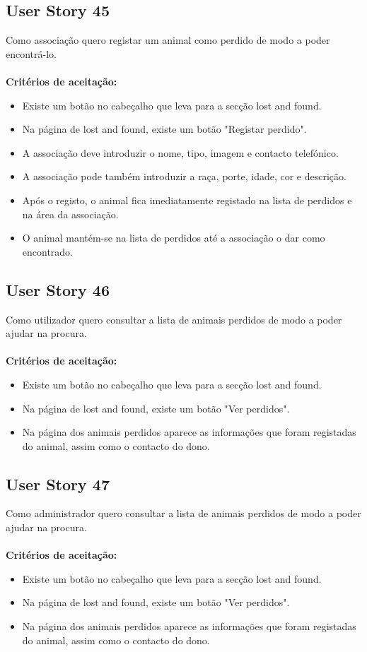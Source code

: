 \documentclass[a4paper,11pt]{article}
\begin{document}
\subsection*{User Story 45}
Como associação quero registar um animal como perdido de modo a poder encontrá-lo.\\\\
\textbf{Critérios de aceitação:}
\begin{itemize}
  \item Existe um botão no cabeçalho que leva para a secção lost and found.
  \item Na página de lost and found, existe um botão "Registar perdido".
  \item A associação deve introduzir o nome, tipo, imagem e contacto telefónico.
  \item A associação pode também introduzir a raça, porte, idade, cor e descrição.
  \item Após o registo, o animal fica imediatamente registado na lista de perdidos e na área da associação.
  \item O animal mantém-se na lista de perdidos até a associação o dar como encontrado.
\end{itemize}

\subsection*{User Story 46}
Como utilizador quero consultar a lista de animais perdidos de modo a poder ajudar na procura.\\\\
\textbf{Critérios de aceitação:}
\begin{itemize}
  \item Existe um botão no cabeçalho que leva para a secção lost and found.
  \item Na página de lost and found, existe um botão "Ver perdidos".
  \item Na página dos animais perdidos aparece as informações que foram registadas do animal, assim como o contacto do dono.
\end{itemize}

\subsection*{User Story 47}
Como administrador quero consultar a lista de animais perdidos de modo a poder ajudar na procura.\\\\
\textbf{Critérios de aceitação:}
\begin{itemize}
  \item Existe um botão no cabeçalho que leva para a secção lost and found.
  \item Na página de lost and found, existe um botão "Ver perdidos".
  \item Na página dos animais perdidos aparece as informações que foram registadas do animal, assim como o contacto do dono.
\end{itemize}
\end{document}
